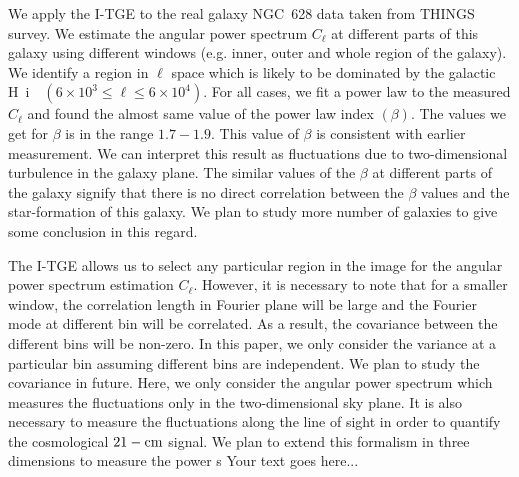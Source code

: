 \documentclass{article}
\def\HI{H~{\sc i}~}
\begin{document}
We apply the I-TGE to the real galaxy NGC~628 data taken from THINGS
survey. We estimate the angular power spectrum $C_{\ell}$ at
different parts of this galaxy using different windows (e.g. inner,
outer and whole region of the galaxy). We identify a region in $\ell$
space which is likely to be dominated by the galactic
\HI~$(6\times10^3\le\ell\le6\times10^4)$. For all cases, we fit a
power law to the measured $C_{\ell}$ and found the almost same value
of the power law index $(\beta)$. The values we get for $\beta$ is in
the range $1.7-1.9$. This value of $\beta$ is consistent with earlier
measurement. We can interpret this result as fluctuations due to
two-dimensional turbulence in the galaxy plane. The similar values of
the $\beta$ at different parts of the galaxy signify that there is no
direct correlation between the $\beta$ values and the star-formation
of this galaxy. We plan to study more number of galaxies to give some
conclusion in this regard.

The I-TGE allows us to select any particular region in the image for
the angular power spectrum estimation $C_{\ell}$. However, it is
necessary to note that for a smaller window, the correlation length in
Fourier plane will be large and the Fourier mode at different bin will
be correlated. As a result, the covariance between the different bins
will be non-zero. In this paper, we only consider the variance at a
particular bin assuming different bins are independent. We plan to
study the covariance in future. Here, we only consider the angular
power spectrum which measures the fluctuations only in the
two-dimensional sky plane. It is also necessary to measure the
fluctuations along the line of sight in order to quantify the
cosmological $21-{\rm cm}$ signal. We plan to extend this formalism in
three dimensions to measure the power s
Your text goes here...

%
%
\end{document}
